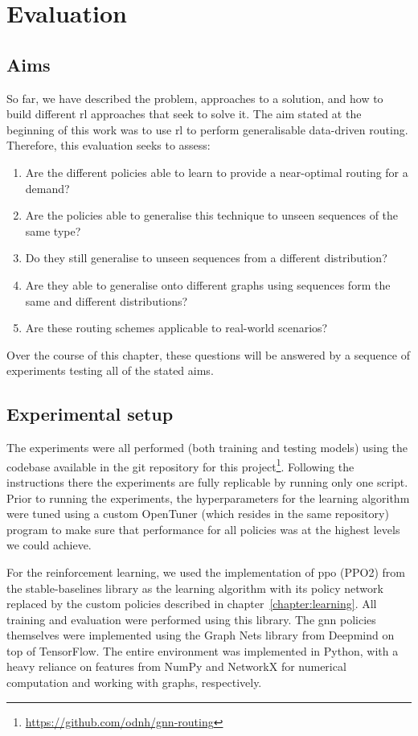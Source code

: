 \chapter{Evaluation}
\label{chapter:evaluation}

\section{Aims}
So far, we have described the problem, approaches to a solution, and how to build different \ac{rl} approaches that seek to solve it. The aim stated at the beginning of this work was to use \ac{rl} to perform generalisable data-driven routing. Therefore, this evaluation seeks to assess:

\begin{enumerate}
\item Are the different policies able to learn to provide a near-optimal routing for a demand?
\item Are the policies able to generalise this technique to unseen sequences of the same type?
\item Do they still generalise to unseen sequences from a different distribution?
\item Are they able to generalise onto different graphs using sequences form the same and different distributions?
\item Are these routing schemes applicable to real-world scenarios?
\end{enumerate}

Over the course of this chapter, these questions will be answered by a sequence of experiments testing all of the stated aims.


\section{Experimental setup}
The experiments were all performed (both training and testing models) using the codebase available in the git repository for this project\footnote{\url{https://github.com/odnh/gnn-routing}}. Following the instructions there the experiments are fully replicable by running only one script. Prior to running the experiments, the hyperparameters for the learning algorithm were tuned using a custom OpenTuner\cite{ansel2014opentuner} (which resides in the same repository) program to make sure that performance for all policies was at the highest levels we could achieve.

For the reinforcement learning, we used the implementation of \ac{ppo} (PPO2) from the stable-baselines\cite{stable-baselines} library as the learning algorithm with its policy network replaced by the custom policies described in chapter~\ref{chapter:learning}. All training and evaluation were performed using this library. The \ac{gnn} policies themselves were implemented using the Graph Nets\cite{battaglia2018relational} library from Deepmind on top of TensorFlow\cite{tensorflow2015-whitepaper}. The entire environment was implemented in Python\cite{10.5555/1593511}, with a heavy reliance on features from NumPy\cite{oliphant2006guide} and NetworkX\cite{hagberg2008exploring} for numerical computation and working with graphs, respectively.

